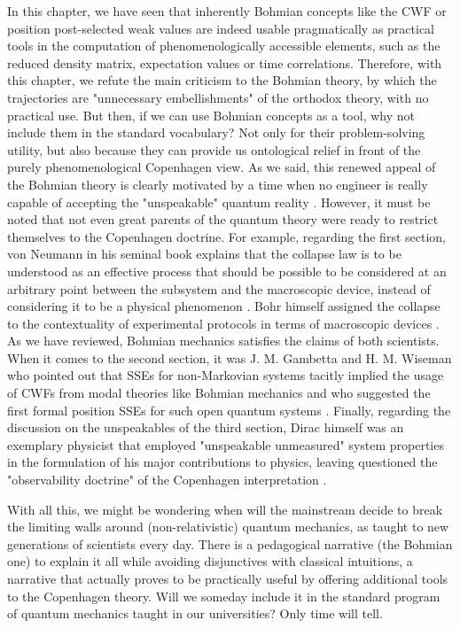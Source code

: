 \documentclass[11pt, a4paper]{article} %
\begin{document}
In this chapter, we have seen that inherently Bohmian concepts like the CWF or position post-selected weak values are indeed usable pragmatically as practical tools in the computation of phenomenologically accessible elements, such as the reduced density matrix, expectation values or time correlations. Therefore, with this chapter, we refute the main criticism to the Bohmian theory, by which the trajectories are "unnecessary embellishments" of the orthodox theory, with no practical use. But then, if we can use Bohmian concepts as a tool, why not include them in the standard vocabulary? Not only for their problem-solving utility, but also because they can provide us ontological relief in front of the purely phenomenological Copenhagen view. As we said, this renewed appeal of the Bohmian theory is clearly motivated by a time when no engineer is really capable of accepting the "unspeakable" quantum reality \cite{where, consp}. However, it must be noted that not even great parents of the quantum theory were ready to restrict themselves to the Copenhagen doctrine. For example, regarding the first section, von Neumann in his seminal book \cite{vonNeumann} explains that the collapse law is to be understood as an effective process that should be possible to be considered at an arbitrary point between the subsystem and the macroscopic device, instead of considering it to be a physical phenomenon \cite{NeumannNoCollapse}. Bohr himself assigned the collapse to the contextuality of experimental protocols in terms of macroscopic devices \cite{Dirac}. As we have reviewed, Bohmian mechanics satisfies the claims of both scientists. When it comes to the second section, it was J. M. Gambetta and H. M. Wiseman who pointed out that SSEs for non-Markovian systems tacitly implied the usage of CWFs from modal theories like Bohmian mechanics \cite{interpretSSE, NMisModal} and who suggested the first formal position SSEs for such open quantum systems \cite{WisemanSSE}. Finally, regarding the discussion on the unspeakables of the third section, Dirac himself was an exemplary physicist that employed "unspeakable unmeasured" system properties in the formulation of his major contributions to physics, leaving questioned the "observability doctrine" of the Copenhagen interpretation \cite{Dirac}.

With all this, we might be wondering when will the mainstream decide to break the limiting walls around (non-relativistic) quantum mechanics, as taught to new generations of scientists every day. There is a pedagogical narrative (the Bohmian one) to explain it all while avoiding disjunctives with classical intuitions, a narrative that actually proves to be practically useful by offering additional tools to the Copenhagen theory. Will we someday include it in the standard program of quantum mechanics taught in our universities? Only time will tell.
\vspace{-0.2cm}

{
%
\printbibliography
%
}
\end{document}
